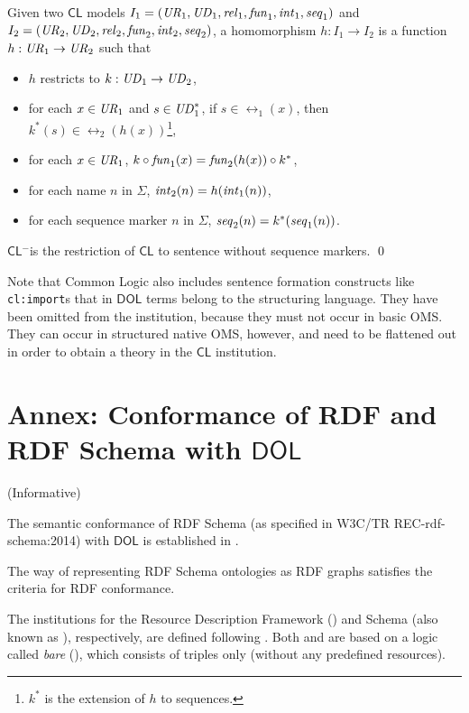 \documentclass[10pt,fleqn,final]{scrreprt}
\newcommand*{\CL}{\ensuremath{\mathsf{CL}}\xspace}
\newcommand*{\DOL}{\ensuremath{\mathsf{DOL}}\xspace}
\newcommand{\CLminus}{\CL$^-$}
\newcommand{\informative}[0]{{\begin{center}{\Large{(Informative})}\end{center}} \bigskip}
\newcommand{\nisref}[1]{#1}
\newcommand{\infannex}[1]{ \chapter{Annex: #1}  \informative }
\newenvironment{definitions}[0]{\medskip }{}
\begin{document}
\begin{definitions}
\begin{definition}
Given two \CL models $I_1=(\mathit{UR}_1,\mathit{UD}_1,\mathit{rel}_1,\mathit{fun}_1,\mathit{int}_1,\mathit{seq}_1)$
and  $I_2=(\mathit{UR}_2,\mathit{UD}_2,\mathit{rel}_2,\mathit{fun}_2,\mathit{int}_2,\mathit{seq}_2)$, a homomorphism
$h:I_1\to I_2$ is a function $h:\mathit{UR}_1\to\mathit{UR}_2$ such that
\begin{itemize}
\item $h$ restricts to $k:\mathit{UD}_1\to\mathit{UD}_2$,
\item for each $x\in\mathit{UR}_1$ and $s\in\mathit{UD}_1^*$, if $s\in\rel_1(x)$, then $k^*(s)\in\rel_2(h(x))$\footnote{$k^*$ is the extension of $h$ to sequences.},
\item for each $x\in\mathit{UR}_1$, $k\circ\mathit{fun}_1(x)=\mathit{fun}_2(h(x))\circ k^*$,
\item for each name $n$ in $\Sigma$, $\mathit{int}_2(n)=h(\mathit{int}_1(n))$,
\item for each sequence marker $n$ in $\Sigma$, $\mathit{seq}_2(n)=k^*(\mathit{seq}_1(n))$.
\end{itemize}

  \CLminus is the restriction of \CL to sentence
without sequence markers.
\qed\end{definition}

Note that Common Logic also includes sentence formation constructs like
\texttt{cl:import}s that in \DOL terms belong to the structuring
language. They have been omitted from the institution, because
they must not occur in basic OMS. They can occur in
structured native OMS, however, and need to be flattened out
in order to obtain a theory in the \CL institution.
 
\infannex{Conformance of RDF and RDF Schema with \DOL}\label{a:rdfs}

The semantic conformance of RDF Schema (as specified in \nisref{W3C/TR REC-rdf-schema:2014}) with \DOL is established in \cite{OntoGraph}.

The way of representing RDF Schema ontologies as RDF graphs satisfies the criteria for RDF conformance.


\begin{definition}
  
The institutions for the Resource Description
Framework (\RDF) and \RDF Schema (also known as \RDFS), respectively, are defined following \cite{Lucanu}. Both \RDF and \RDFS 
 are based on a logic called \emph{bare} \RDF (\SimpleRDF), which consists
of triples only (without any predefined resources).


\end{definition}
\end{definitions}
\end{document}
